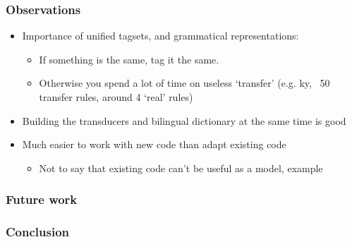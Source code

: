 \documentclass[10pt,xetex]{beamer} %
\begin{document}
\begin{frame}
  \frametitle{Observations}

\begin{itemize}
  \item Importance of unified tagsets, and grammatical representations:
  \begin{itemize}
    \item If something is the same, tag it the same.
    \item Otherwise you spend a lot of time on useless `transfer'
      (e.g. ky, ~50 transfer rules, around 4 `real' rules)
  \end{itemize}
  \item Building the transducers and bilingual dictionary at the same time is good
  \item Much easier to work with new code than adapt existing code
  \begin{itemize}
    \item Not to say that existing code can't be useful as a model, example
  \end{itemize}

\end{itemize}

\end{frame}


\begin{frame}
  \frametitle{Future work}

\end{frame}

\begin{frame}
  \frametitle{Conclusion}

\end{frame}
\end{document}
